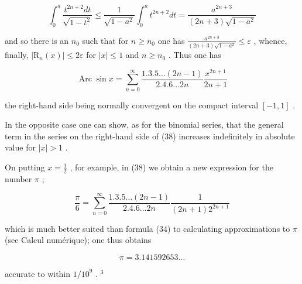 \[
\int_ {0} ^ {a} \frac {t ^ {2 n + 2} d t}{\sqrt {1 - t ^ {2}}} \leqslant \frac {1}{\sqrt {1 - a ^ {2}}} \int_ {0} ^ {a} t ^ {2 n + 2} d t = \frac {a ^ {2 n + 3}}{(2 n + 3) \sqrt {1 - a ^ {2}}}
\]

and so there is an \(n_0\) such that for \(n \geqslant n_0\) one has \(\frac{a^{2n+3}}{(2n+3)\sqrt{1-a^2}} \leqslant \varepsilon\) , whence, finally, \(|\mathrm{R}_n(x)| \leqslant 2\varepsilon\) for \(|x| \leqslant 1\) and \(n \geqslant n_0\) . Thus one has

\[
\operatorname{Arc} \sin x = \sum_ {n = 0} ^ {\infty} \frac {1 . 3 . 5 \dots (2 n - 1)}{2 . 4 . 6 \dots 2 n} \frac {x ^ {2 n + 1}}{2 n + 1}\tag{38}
\]

the right-hand side being normally convergent on the compact interval \([-1, 1]\) .

In the opposite case one can show, as for the binomial series, that the general term in the series on the right-hand side of (38) increases indefinitely in absolute value for \(|x| > 1\) .

On putting \(x = \frac{1}{2}\) , for example, in (38) we obtain a new expression for the number \(\pi\) ;

\[
\frac {\pi}{6} = \sum_ {n = 0} ^ {\infty} \frac {1 . 3 . 5 \dots (2 n - 1)}{2 . 4 . 6 \dots 2 n} \frac {1}{(2 n + 1) 2 ^ {2 n + 1}}
\]

which is much better suited than formula (34) to calculating approximations to \(\pi\) (see Calcul numérique); one thus obtains

\[
\pi = 3. 1 4 1   5 9 2   6 5 3 \dots
\]

accurate to within \(1/10^{9}\) . \(^{3}\)
